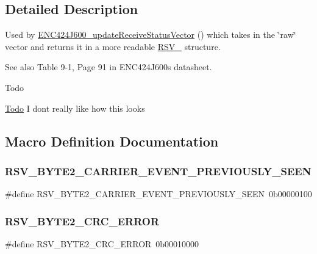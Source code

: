 \subsection{Detailed Description}
Used by \mbox{\hyperlink{group__rsv_ga5a1203b009d49bbcf4ea43dc4a0ab2ff}{E\+N\+C424\+J600\+\_\+update\+Receive\+Status\+Vector}} () which takes in the \char`\"{}raw\char`\"{} vector and returns it in a more readable \mbox{\hyperlink{struct_r_s_v__}{R\+S\+V\+\_\+}} structure. \begin{DoxySeeAlso}{See also}
Table 9-\/1, Page 91 in E\+N\+C424\+J600\textquotesingle{}s datasheet. 
\end{DoxySeeAlso}
\begin{DoxyRefDesc}{Todo}
\item[\mbox{\hyperlink{todo__todo000004}{Todo}}]I don\textquotesingle{}t really like how this looks\end{DoxyRefDesc}


\subsection{Macro Definition Documentation}
\mbox{\label{group___receive_gafcc8915d0220c1ed83eb1147ce4e9e09}} 
\subsubsection{\texorpdfstring{RSV\_BYTE2\_CARRIER\_EVENT\_PREVIOUSLY\_SEEN}{RSV\_BYTE2\_CARRIER\_EVENT\_PREVIOUSLY\_SEEN}}
{\footnotesize\ttfamily \#define R\+S\+V\+\_\+\+B\+Y\+T\+E2\+\_\+\+C\+A\+R\+R\+I\+E\+R\+\_\+\+E\+V\+E\+N\+T\+\_\+\+P\+R\+E\+V\+I\+O\+U\+S\+L\+Y\+\_\+\+S\+E\+EN~0b00000100}

\mbox{\label{group___receive_gace08d6adf3cc71efe58de192f32e7eed}} 
\subsubsection{\texorpdfstring{RSV\_BYTE2\_CRC\_ERROR}{RSV\_BYTE2\_CRC\_ERROR}}
{\footnotesize\ttfamily \#define R\+S\+V\+\_\+\+B\+Y\+T\+E2\+\_\+\+C\+R\+C\+\_\+\+E\+R\+R\+OR~0b00010000}

